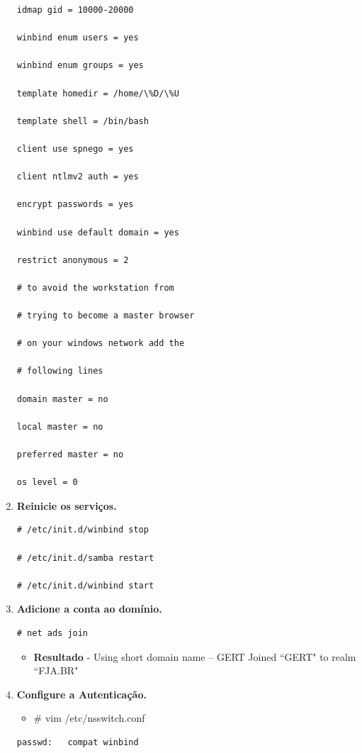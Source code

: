 \begin{enumerate}
\begin{lstlisting}
idmap gid = 10000-20000

winbind enum users = yes

winbind enum groups = yes

template homedir = /home/\%D/\%U

template shell = /bin/bash

client use spnego = yes

client ntlmv2 auth = yes

encrypt passwords = yes

winbind use default domain = yes

restrict anonymous = 2

# to avoid the workstation from

# trying to become a master browser

# on your windows network add the

# following lines

domain master = no

local master = no

preferred master = no

os level = 0
\end{lstlisting}

	\item \textbf{Reinicie os serviços.}\\
		\begin{lstlisting}
# /etc/init.d/winbind stop

# /etc/init.d/samba restart

# /etc/init.d/winbind start
\end{lstlisting}

	\item \textbf{Adicione a conta ao domínio.}\\
		\begin{lstlisting}
# net ads join
		\end{lstlisting}
		\begin{itemize}
			\item \textbf{Resultado} - Using short domain name – GERT Joined ``GERT" to realm ``FJA.BR"
		\end{itemize}

	\item \textbf{Configure a Autenticação.}
		\begin{itemize}
				\item \# vim /etc/nsswitch.conf\\
		\end{itemize}
		\begin{lstlisting}
passwd:   compat winbind


\end{lstlisting}
\end{enumerate}
